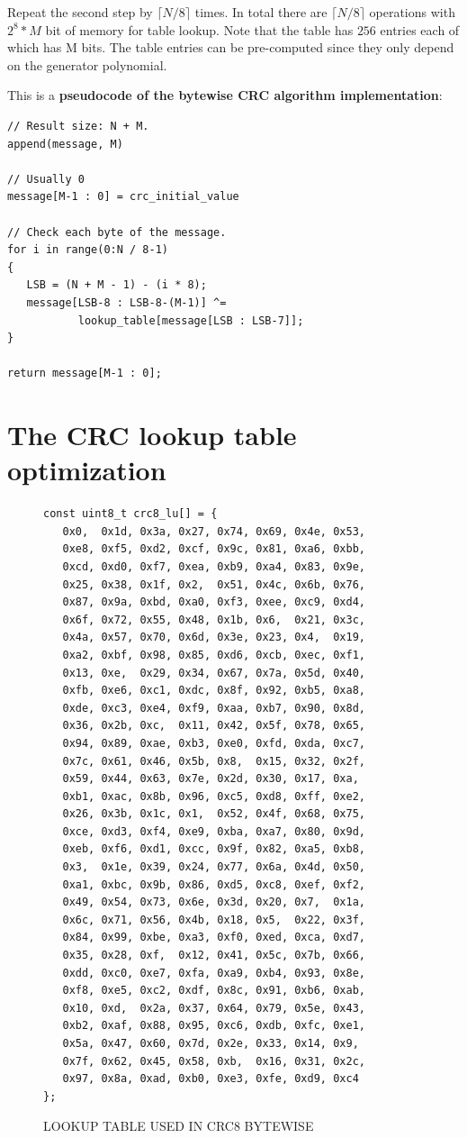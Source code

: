 \documentclass[fleqn]{IEEEtran}
\begin{document}
Repeat the second step by $\lceil{}N/8\rceil$ times. In total 
there are $\lceil{}N/8\rceil$ operations with $2^8*M$ bit of memory for table 
lookup. Note that the table has $256$ entries each of which has M bits. 
The table entries can be pre-computed since they only depend on the generator 
polynomial.

This is a \textbf{pseudocode of the bytewise CRC algorithm implementation}:
\begin{verbatim}
// Result size: N + M.
append(message, M)

// Usually 0
message[M-1 : 0] = crc_initial_value

// Check each byte of the message.
for i in range(0:N / 8-1) 
{
   LSB = (N + M - 1) - (i * 8);
   message[LSB-8 : LSB-8-(M-1)] ^= 
           lookup_table[message[LSB : LSB-7]];
}

return message[M-1 : 0];
\end{verbatim}


\section{The CRC lookup table optimization}
\begin{figure}[bt]
\begin{scriptsize}
\begin{verbatim}
const uint8_t crc8_lu[] = {
   0x0,  0x1d, 0x3a, 0x27, 0x74, 0x69, 0x4e, 0x53,
   0xe8, 0xf5, 0xd2, 0xcf, 0x9c, 0x81, 0xa6, 0xbb,
   0xcd, 0xd0, 0xf7, 0xea, 0xb9, 0xa4, 0x83, 0x9e,
   0x25, 0x38, 0x1f, 0x2,  0x51, 0x4c, 0x6b, 0x76,
   0x87, 0x9a, 0xbd, 0xa0, 0xf3, 0xee, 0xc9, 0xd4,
   0x6f, 0x72, 0x55, 0x48, 0x1b, 0x6,  0x21, 0x3c,
   0x4a, 0x57, 0x70, 0x6d, 0x3e, 0x23, 0x4,  0x19,
   0xa2, 0xbf, 0x98, 0x85, 0xd6, 0xcb, 0xec, 0xf1,
   0x13, 0xe,  0x29, 0x34, 0x67, 0x7a, 0x5d, 0x40,
   0xfb, 0xe6, 0xc1, 0xdc, 0x8f, 0x92, 0xb5, 0xa8,
   0xde, 0xc3, 0xe4, 0xf9, 0xaa, 0xb7, 0x90, 0x8d,
   0x36, 0x2b, 0xc,  0x11, 0x42, 0x5f, 0x78, 0x65,
   0x94, 0x89, 0xae, 0xb3, 0xe0, 0xfd, 0xda, 0xc7,
   0x7c, 0x61, 0x46, 0x5b, 0x8,  0x15, 0x32, 0x2f,
   0x59, 0x44, 0x63, 0x7e, 0x2d, 0x30, 0x17, 0xa,
   0xb1, 0xac, 0x8b, 0x96, 0xc5, 0xd8, 0xff, 0xe2,
   0x26, 0x3b, 0x1c, 0x1,  0x52, 0x4f, 0x68, 0x75,
   0xce, 0xd3, 0xf4, 0xe9, 0xba, 0xa7, 0x80, 0x9d,
   0xeb, 0xf6, 0xd1, 0xcc, 0x9f, 0x82, 0xa5, 0xb8,
   0x3,  0x1e, 0x39, 0x24, 0x77, 0x6a, 0x4d, 0x50,
   0xa1, 0xbc, 0x9b, 0x86, 0xd5, 0xc8, 0xef, 0xf2,
   0x49, 0x54, 0x73, 0x6e, 0x3d, 0x20, 0x7,  0x1a,
   0x6c, 0x71, 0x56, 0x4b, 0x18, 0x5,  0x22, 0x3f,
   0x84, 0x99, 0xbe, 0xa3, 0xf0, 0xed, 0xca, 0xd7,
   0x35, 0x28, 0xf,  0x12, 0x41, 0x5c, 0x7b, 0x66,
   0xdd, 0xc0, 0xe7, 0xfa, 0xa9, 0xb4, 0x93, 0x8e,
   0xf8, 0xe5, 0xc2, 0xdf, 0x8c, 0x91, 0xb6, 0xab,
   0x10, 0xd,  0x2a, 0x37, 0x64, 0x79, 0x5e, 0x43,
   0xb2, 0xaf, 0x88, 0x95, 0xc6, 0xdb, 0xfc, 0xe1,
   0x5a, 0x47, 0x60, 0x7d, 0x2e, 0x33, 0x14, 0x9,
   0x7f, 0x62, 0x45, 0x58, 0xb,  0x16, 0x31, 0x2c,
   0x97, 0x8a, 0xad, 0xb0, 0xe3, 0xfe, 0xd9, 0xc4
};
\end{verbatim}
\end{scriptsize}
\caption{LOOKUP TABLE USED IN CRC8 BYTEWISE}
\label{fig:LT-CRC8}
\end{figure}
\end{document}
